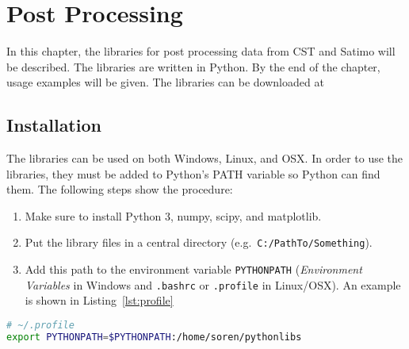 \chapter{Post Processing}
\label{cha:postproc}

In this chapter, the libraries for post processing data from CST and Satimo will be described. The libraries are written in Python. By the end of the chapter, usage examples will be given. The libraries can be downloaded at 

\section{Installation}
\label{sec:pythoninstall}
The libraries can be used on both Windows, Linux, and OSX. In order to use the libraries, they must be added to Python's PATH variable so Python can find them. The following steps show the procedure:
\begin{enumerate}
\item Make sure to install Python 3, numpy, scipy, and matplotlib.
\item Put the library files in a central directory (e.g.\ \texttt{C:/PathTo/Something}).
\item Add this path to the environment variable \texttt{PYTHONPATH} (\emph{Environment Variables} in Windows and \texttt{.bashrc} or \texttt{.profile} in Linux/OSX). An example is shown in Listing~\ref{lst:profile}
\end{enumerate}
\begin{lstlisting}[caption={Example of a \texttt{.profile} file for Linux, adding a library directory to the Python path.}, label=lst:profile, language=sh]
# ~/.profile
export PYTHONPATH=$PYTHONPATH:/home/soren/pythonlibs
\end{lstlisting}

